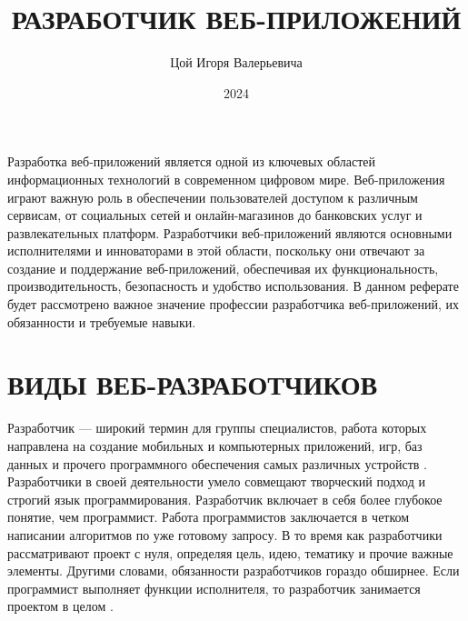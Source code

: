 \documentclass[referat, times]{SCWorks}
\begin{document}

\title{РАЗРАБОТЧИК ВЕБ-ПРИЛОЖЕНИЙ}




\author{Цой Игоря Валерьевича}

\date{2024}

\maketitle

\tableofcontents

\intro

Разработка веб-приложений является одной из ключевых областей информационных технологий в современном цифровом мире. Веб-приложения играют важную роль в обеспечении пользователей доступом к различным сервисам, от социальных сетей и онлайн-магазинов до банковских услуг и развлекательных платформ. Разработчики веб-приложений являются основными исполнителями и инноваторами в этой области, поскольку они отвечают за создание и поддержание веб-приложений, обеспечивая их функциональность, производительность, безопасность и удобство использования. В данном реферате будет рассмотрено важное значение профессии разработчика веб-приложений, их обязанности и  требуемые навыки.


\section{\textbf{ВИДЫ ВЕБ-РАЗРАБОТЧИКОВ}}
    Разработчик --- широкий термин для группы специалистов, работа которых направлена на создание мобильных и компьютерных приложений, игр, баз данных и прочего программного обеспечения самых различных устройств \cite{1}. Разработчики в своей деятельности умело совмещают творческий подход и строгий язык программирования. Разработчик включает в себя более глубокое понятие, чем программист. Работа программистов заключается в четком написании алгоритмов по уже готовому запросу. В то время как разработчики рассматривают проект с нуля, определяя цель, идею, тематику и прочие важные элементы. Другими словами, обязанности разработчиков гораздо обширнее. Если программист выполняет функции исполнителя, то разработчик занимается проектом в целом \cite{2}.
\end{document}
